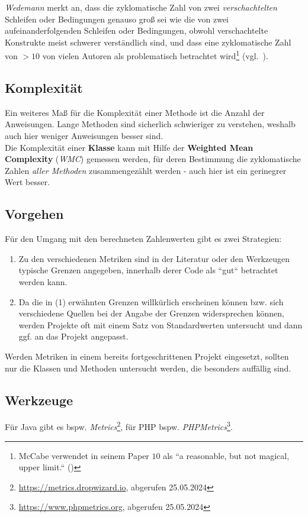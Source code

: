 \noindent
\textit{Wedemann} merkt an, dass die zyklomatische Zahl von zwei \textit{verschachtelten} Schleifen oder Bedingungen genauso groß sei wie die von zwei aufeinanderfolgenden Schleifen oder Bedingungen, obwohl verschachtelte Konstrukte meist schwerer verständlich sind, und dass eine zyklomatische Zahl von $>10$ von vielen Autoren als problematisch betrachtet wird\footnote{
McCabe verwendet in seinem Paper $10$ als ``a reasonable, but not magical,  upper limit.`` (\cite[314]{McC76})
} (vgl.~\cite[38]{Wed09c}).


\subsection*{Komplexität}
Ein weiteres Maß für die Komplexität einer Methode ist die Anzahl der Anweisungen.
Lange Methoden sind sicherlich schwieriger zu verstehen, weshalb auch hier weniger Anweisungen besser sind.\\
Die Komplexität einer \textbf{Klasse} kann mit Hilfe der \textbf{Weighted Mean Complexity} (\textit{WMC}) gemessen werden, für deren Bestimmung die zyklomatische Zahlen \textit{aller Methoden} zusammengezählt werden - auch hier ist ein gerinegrer Wert besser.

\subsection*{Vorgehen}
Für den Umgang mit den berechneten Zahlenwerten gibt es zwei Strategien:

\begin{enumerate}
    \item Zu den verschiedenen Metriken sind in der Literatur oder den Werkzeugen typische Grenzen angegeben, innerhalb derer Code als ``gut`` betrachtet werden kann.
    \item Da die in (1) erwähnten Grenzen willkürlich erscheinen können bzw. sich verschiedene Quellen bei der Angabe der Grenzen widersprechen können, werden Projekte oft mit einem Satz von Standardwerten untersucht und dann ggf. an das Projekt angepasst.
\end{enumerate}

\noindent
Werden Metriken in einem bereits fortgeschrittenen Projekt eingesetzt, sollten nur die Klassen und Methoden untersucht werden, die besonders auffällig sind.

\subsection*{Werkzeuge}
Für Java gibt es bspw. \textit{Metrics}\footnote{
\url{https://metrics.dropwizard.io}, abgerufen 25.05.2024
}, für PHP bspw. \textit{PHPMetrics}\footnote{
    \url{https://www.phpmetrics.org}, abgerufen 25.05.2024
}.

